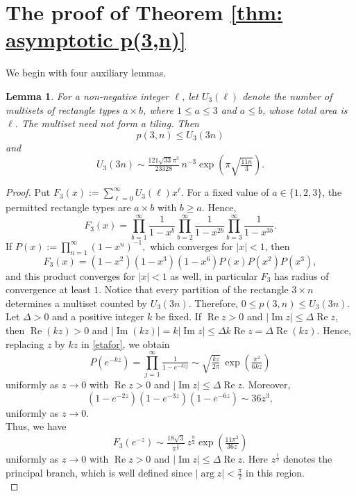 \documentclass[12pt,a4paper]{amsart}
\numberwithin{equation}{section}
\theoremstyle{plain}
\newtheorem{lm}[thm]{Lemma}
\theoremstyle{definition}
\theoremstyle{remark}
\begin{document}
\section{The proof of Theorem \ref{thm: asymptotic p(3,n)}}

We begin with four auxiliary lemmas.

\begin{lm}\label{lm: unrestricted p3}
For a non-negative integer $\ell$, let $U_3(\ell)$ denote the number of multisets of rectangle types $a\times b$, where $1\le  a\le 3$ and $a\le  b$, whose total area is $\ell$. The multiset need not form a tiling. Then
$$
p(3,n)\le  U_3(3n)
$$
and
$$
U_3(3n)
\sim
\tfrac{121\sqrt{33}\pi^3}{23328}\,
n^{-3}
\exp\left(
\pi\sqrt{\tfrac{11n}{3}}
\right).
$$
\end{lm}

\begin{proof}
Put
$
F_3(x):=\sum_{\ell=0}^{\infty}U_3(\ell)x^\ell.
$
For a fixed value of $a\in\{1,2,3\}$, the permitted rectangle types are $a\times b$ with $b\geq a$. Hence,
$$
F_3(x)
=
\prod_{b=1}^{\infty}\frac{1}{1-x^b}
\prod_{b=2}^{\infty}\frac{1}{1-x^{2b}}
\prod_{b=3}^{\infty}\frac{1}{1-x^{3b}}.
$$
If
$
P(x):=\prod_{n=1}^{\infty}(1-x^n)^{-1},
$
which converges for $|x|<1$, then
$$
F_3(x)
=
(1-x^2)(1-x^3)(1-x^6)
P(x)P(x^2)P(x^3),
$$
and this product converges for $|x|<1$ as well, in particular $F_3$ has radius of convergence at least $1$.
Notice that every partition of the rectangle $3\times n$ determines a multiset counted by $U_3(3n)$. Therefore, $0\le  p(3,n)\le U_3(3n)$.\\ 
Let $\Delta>0$ and a positive integer $k$ be fixed. If $\operatorname{Re}z>0$ and $|\operatorname{Im}z|\le \Delta\operatorname{Re}z$, then $\operatorname{Re}(kz)>0$ and
$
|\operatorname{Im}(kz)|
=
k|\operatorname{Im}z|
\le 
\Delta k\operatorname{Re}z
=
\Delta\operatorname{Re}(kz).
$
Hence, replacing $z$ by $kz$ in \eqref{etafor}, we obtain
$$
P(e^{-kz})
=
\prod_{j=1}^{\infty}\tfrac{1}{1-e^{-kzj}}
\sim
\sqrt{\tfrac{kz}{2\pi}}\,
\exp\left(
\tfrac{\pi^2}{6kz}
\right)
$$
uniformly as $z\to0$ with $\operatorname{Re}z>0$ and $|\operatorname{Im}z|\le \Delta\operatorname{Re}z$.
Moreover,
$$
(1-e^{-2z})(1-e^{-3z})(1-e^{-6z})\sim36z^3, 
$$
uniformly as $z\to 0.$\\
Thus, we have
\begin{equation}\label{assF3}
F_3(e^{-z})
\sim
\tfrac{18\sqrt3}{\pi^{\frac{3}{2}}}\,
z^{\frac{9}{2}}
\exp\left(
\tfrac{11\pi^2}{36z}
\right)
\end{equation}
uniformly as $z\to0$ with $\operatorname{Re}z>0$ and $|\operatorname{Im}z|\le \Delta\operatorname{Re}z$. Here $z^{\frac{1}{2}}$ denotes the principal branch, which is well defined since $|\arg z|<\tfrac{\pi}{2}$ in this region.\\

\end{proof}
\end{document}
